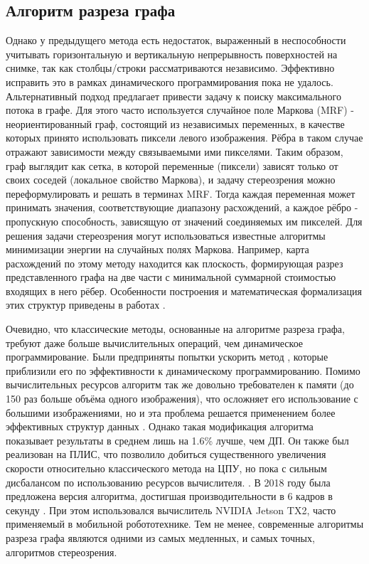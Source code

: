 \subsection{Алгоритм разреза графа}
Однако у предыдущего метода есть недостаток, выраженный в неспособности учитывать горизонтальную и вертикальную непрерывность поверхностей на снимке, так как столбцы/строки рассматриваются независимо. Эффективно исправить 
это в рамках динамического программирования пока не удалось. Альтернативный подход предлагает привести задачу к поиску максимального потока в графе. Для этого часто используется случайное поле Маркова (MRF) - неориентированный граф,
состоящий из независимых переменных, в качестве которых принято использовать пиксели левого изображения. Рёбра в таком случае отражают зависимости между связываемыми ими пикселями. Таким образом, граф выглядит как сетка, в которой 
переменные (пиксели) зависят только от своих соседей (локальное свойство Маркова), и задачу стереозрения можно переформулировать и решать в терминах MRF.  
Тогда каждая переменная может принимать значения, соответствующие диапазону расхождений, а каждое рёбро - пропускную способность, зависящую от значений соединяемых им пикселей.  
Для решения задачи стереозрения могут использоваться известные алгоритмы минимизации энергии на случайных полях Маркова. Например, карта расхождений по этому методу находится как плоскость, формирующая разрез представленного графа на две части с минимальной 
суммарной стоимостью входящих в него рёбер. Особенности построения и математическая формализация этих структур приведены в работах \cite{graphcut,gc_ocl}. 

Очевидно, что классические методы, основанные на алгоритме разреза графа, требуют даже больше вычислительных операций, чем динамическое программирование. Были предприняты попытки ускорить метод \cite{fast_gc,graphcut}, 
которые приблизили его по эффективности к динамическому программированию. Помимо вычислительных ресурсов алгоритм так же довольно требователен к памяти (до  150 раз больше объёма одного изображения), что осложняет его использование 
с большими изображениями, но и эта проблема решается применением более эффективных структур данных \cite{effic_gc}. Однако такая модификация алгоритма показывает результаты в среднем лишь на 1.6\%  лучше, чем ДП. Он также был реализован 
на ПЛИС, что позволило добиться существенного увеличения скорости относительно классического метода на ЦПУ, но пока с сильным дисбалансом по использованию ресурсов вычислителя. \cite{fpga_gc}. В 2018 году была предложена версия алгоритма, 
достигшая производительности в 6 кадров в секунду \cite{jetson_gc}. При этом использовался вычислитель NVIDIA Jetson TX2, часто применяемый в мобильной робототехнике. 
Тем не менее, современные алгоритмы разреза графа являются одними из самых медленных, и самых  точных, алгоритмов стереозрения. 

